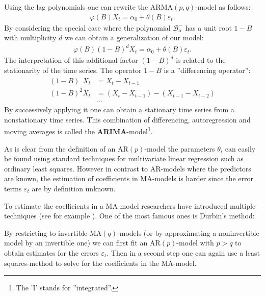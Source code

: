 	Using the lag polynomials one can rewrite the ARMA$(p, q)$-model as follows:
	\begin{gather}
		\varphi(B)X_t = \alpha_0 + \theta(B)\varepsilon_t.
	\end{gather}
	By considering the special case where the polynomial $\mathcal{B}^-_\alpha$ has a unit root $1-B$ with multiplicity $d$ we can obtain a generalization of our model:
	\begin{gather}
		\varphi(B)(1-B)^dX_t = \alpha_0 + \theta(B)\varepsilon_t.
	\end{gather}
	The interpretation of this additional factor $(1-B)^d$ is related to the stationarity of the time series. The operator $1-B$ is a ''differencing operator'':
	\begin{align*}
		(1-B)\phantom{^2}X_t &= X_t - X_{t-1}\\
		(1-B)^2X_t &= (X_t-X_{t-1}) - (X_{t-1}-X_{t-2})\\
		&\cdots
	\end{align*}
	By successively applying it one can obtain a stationary time series from a nonstationary time series. This combination of differencing, autoregression and moving averages is called the \textbf{ARIMA}-model\footnote{The 'I' stands for ''integrated''.}.
	
	
	\begin{remark}
		As is clear from the definition of an AR$(p)$-model the parameters $\theta_i$ can easily be found using standard techniques for multivariate linear regression such as ordinary least squares. However in contrast to AR-models where the predictors are known, the estimation of coefficients in MA-models is harder since the error terms $\varepsilon_t$ are by definition unknown.
	\end{remark}
	To estimate the coefficients in a MA-model researchers have introduced multiple techniques (see for example \cite{MA_fit}). One of the most famous ones is Durbin's method:
	\begin{method}[Durbin]
		By restricting to invertible MA$(q)$-models (or by approximating a noninvertible model by an invertible one) we can first fit an AR$(p)$-model with $p>q$ to obtain estimates for the errors $\varepsilon_t$. Then in a second step one can again use a least squares-method to solve for the coefficients in the MA-model.
	\end{method}
	
